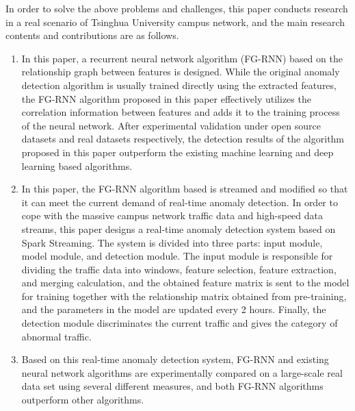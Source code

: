 \begin{abstract*}
  In order to solve the above problems and challenges, this paper conducts research in a real scenario of Tsinghua University campus network, and the main research contents and contributions are as follows.
  \begin{enumerate}
    \item In this paper, a recurrent neural network algorithm (FG-RNN) based on the relationship graph between features is designed. While the original anomaly detection algorithm is usually trained directly using the extracted features, the FG-RNN algorithm proposed in this paper effectively utilizes the correlation information between features and adds it to the training process of the neural network. After experimental validation under open source datasets and real datasets respectively, the detection results of the algorithm proposed in this paper outperform the existing machine learning and deep learning based algorithms.
    \item In this paper, the FG-RNN algorithm based is streamed and modified so that it can meet the current demand of real-time anomaly detection. In order to cope with the massive campus network traffic data and high-speed data streams, this paper designs a real-time anomaly detection system based on Spark Streaming. The system is divided into three parts: input module, model module, and detection module. The input module is responsible for dividing the traffic data into windows, feature selection, feature extraction, and merging calculation, and the obtained feature matrix is sent to the model for training together with the relationship matrix obtained from pre-training, and the parameters in the model are updated every 2 hours. Finally, the detection module discriminates the current traffic and gives the category of abnormal traffic.
    \item Based on this real-time anomaly detection system, FG-RNN and existing neural network algorithms are experimentally compared on a large-scale real data set using several different measures, and both FG-RNN algorithms outperform other algorithms.
  \end{enumerate}



\end{abstract*}
